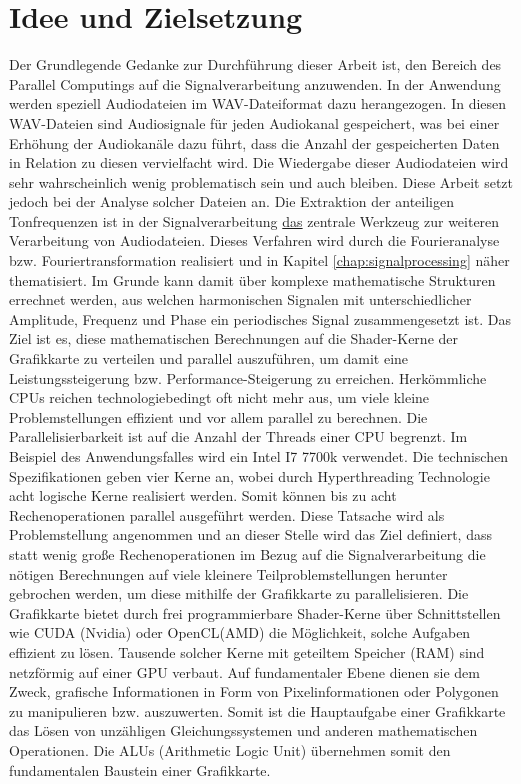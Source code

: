 
\section{Idee und Zielsetzung} \label{idea_goal}

Der Grundlegende Gedanke zur Durchführung dieser Arbeit ist, den Bereich des Parallel Computings auf die Signalverarbeitung anzuwenden. In der Anwendung werden speziell Audiodateien im WAV-Dateiformat dazu herangezogen. In diesen WAV-Dateien sind Audiosignale für jeden Audiokanal gespeichert, was bei einer Erhöhung der Audiokanäle dazu führt, dass die Anzahl der gespeicherten Daten in Relation zu diesen vervielfacht wird. Die Wiedergabe dieser Audiodateien wird sehr wahrscheinlich wenig problematisch sein und auch bleiben. Diese Arbeit setzt jedoch bei der Analyse solcher Dateien an. Die Extraktion der anteiligen Tonfrequenzen ist in der Signalverarbeitung \underline{das} zentrale Werkzeug zur weiteren Verarbeitung von Audiodateien. Dieses Verfahren wird durch die Fourieranalyse bzw. Fouriertransformation realisiert und in Kapitel \ref{chap:signalprocessing} näher thematisiert. Im Grunde kann damit über komplexe mathematische Strukturen errechnet werden, aus welchen harmonischen Signalen mit unterschiedlicher Amplitude, Frequenz und Phase ein periodisches Signal zusammengesetzt ist. Das Ziel ist es, diese mathematischen Berechnungen auf die Shader-Kerne der Grafikkarte zu verteilen und parallel auszuführen, um damit eine Leistungssteigerung bzw. Performance-Steigerung zu erreichen. Herkömmliche  CPUs reichen technologiebedingt oft nicht mehr aus, um viele kleine Problemstellungen effizient und vor allem parallel zu berechnen. Die Parallelisierbarkeit ist auf die Anzahl der Threads einer CPU begrenzt. Im Beispiel des Anwendungsfalles wird ein Intel I7 7700k verwendet. Die technischen Spezifikationen geben vier Kerne an, wobei durch Hyperthreading Technologie acht logische Kerne realisiert werden. Somit können bis zu acht Rechenoperationen parallel ausgeführt werden. Diese Tatsache wird als Problemstellung angenommen und an dieser Stelle wird das Ziel definiert, dass statt wenig große Rechenoperationen im Bezug auf die Signalverarbeitung die nötigen Berechnungen auf viele kleinere Teilproblemstellungen herunter gebrochen werden, um diese mithilfe der Grafikkarte zu parallelisieren. Die Grafikkarte bietet durch frei programmierbare Shader-Kerne über Schnittstellen wie CUDA (Nvidia) oder OpenCL(AMD) die Möglichkeit, solche Aufgaben effizient zu lösen. Tausende solcher Kerne mit geteiltem Speicher (RAM) sind netzförmig auf einer GPU verbaut. Auf fundamentaler Ebene dienen sie dem Zweck, grafische Informationen in Form von Pixelinformationen oder Polygonen zu manipulieren bzw. auszuwerten. Somit ist die Hauptaufgabe einer Grafikkarte das Lösen von unzähligen Gleichungssystemen und anderen mathematischen Operationen. Die ALUs (Arithmetic Logic Unit) übernehmen somit den fundamentalen Baustein einer Grafikkarte. 

